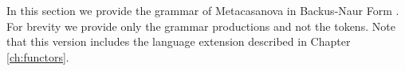 In this section we provide the grammar of Metacasanova in Backus-Naur Form \cite{knuth1964backus}. For brevity we provide only the grammar productions and not the tokens. Note that this version includes the language extension described in Chapter \ref{ch:functors}.

\begin{lstlisting}

\end{lstlisting}